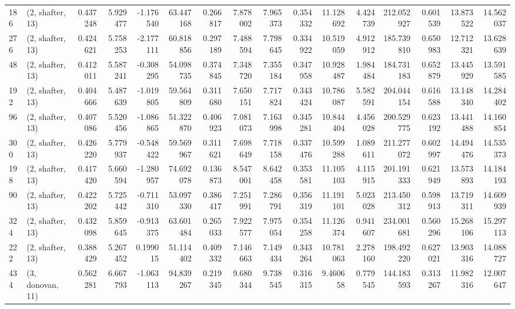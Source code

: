 \begin{tabular}{llrrrrrrrrrrrrrr}
186 &  (2, shafter, 13) &   0.437248 &   5.929477 &  -1.176540 &    63.447168 &   0.266817 &   7.878002 &   7.965373 &  0.354332 &  11.128692 &   4.424739 &   212.052927 &  0.601539 &  13.873522 &  14.562037 \\
276 &  (2, shafter, 13) &   0.424621 &   5.758253 &  -2.177111 &    60.818856 &   0.297189 &   7.488594 &   7.798645 &  0.334922 &  10.519059 &   4.912912 &   185.739810 &  0.650983 &  12.712321 &  13.628639 \\
48  &  (2, shafter, 13) &   0.412011 &   5.587241 &  -0.308295 &    54.098735 &   0.374845 &   7.348720 &   7.355184 &  0.347958 &  10.928487 &   1.984484 &   184.731183 &  0.652879 &  13.445929 &  13.591585 \\
192 &  (2, shafter, 13) &   0.404666 &   5.487639 &  -1.019805 &    59.564809 &   0.311680 &   7.650151 &   7.717824 &  0.343424 &  10.786087 &   5.582591 &   204.044154 &  0.616588 &  13.148340 &  14.284402 \\
96  &  (2, shafter, 13) &   0.407086 &   5.520456 &  -1.086865 &    51.322870 &   0.406923 &   7.081073 &   7.163998 &  0.345281 &  10.844404 &   4.456028 &   200.529775 &  0.623192 &  13.441488 &  14.160854 \\
300 &  (2, shafter, 13) &   0.426220 &   5.779937 &  -0.548422 &    59.569967 &   0.311621 &   7.698649 &   7.718158 &  0.337476 &  10.599288 &   1.089611 &   211.277072 &  0.602997 &  14.494476 &  14.535373 \\
198 &  (2, shafter, 13) &   0.417420 &   5.660594 &  -1.280957 &    74.692078 &   0.136873 &   8.547001 &   8.642458 &  0.353581 &  11.105103 &   4.115915 &   201.191333 &  0.621949 &  13.573893 &  14.184193 \\
90  &  (2, shafter, 13) &   0.422202 &   5.725442 &  -0.711310 &    53.097330 &   0.386417 &   7.251991 &   7.286791 &  0.356319 &  11.191101 &   5.023028 &   213.450312 &  0.598913 &  13.719311 &  14.609939 \\
324 &  (2, shafter, 13) &   0.432098 &   5.859645 &  -0.913375 &    63.601484 &   0.265033 &   7.922577 &   7.975054 &  0.354258 &  11.126374 &   0.941607 &   234.001681 &  0.560296 &  15.268106 &  15.297113 \\
222 &  (2, shafter, 13) &   0.388429 &   5.267452 &   0.199015 &    51.114402 &   0.409332 &   7.146663 &   7.149434 &  0.343264 &  10.781063 &   2.278160 &   198.492220 &  0.627021 &  13.903316 &  14.088727 \\
434 &  (3, donovan, 11) &   0.562281 &   6.667793 &  -1.063113 &    94.839267 &   0.219345 &   9.680344 &   9.738545 &  0.316315 &   9.460658 &   0.779545 &   144.183593 &  0.313267 &  11.982316 &  12.007647 \\

\end{tabular}
